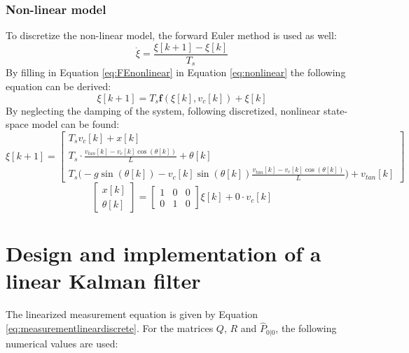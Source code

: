 \documentclass[a4paper,kul]{kulakarticle} %
\begin{document}
\subsubsection*{Non-linear model}
To discretize the non-linear model, the forward Euler method is used as well:
\begin{equation}
	\dot{\xi} = \frac{\xi[k+1]-\xi[k]}{T_s}
	\label{eq:FEnonlinear}
	\end{equation}
	By filling in Equation \ref{eq:FEnonlinear} in Equation \ref{eq:nonlinear} the following equation can be derived:
	\begin{equation}
	\xi[k+1] = T_s\mathbf{f}(\xi[k],v_c[k]) + \xi[k]
	\end{equation}
	By neglecting the damping of the system, following discretized, nonlinear state-space model can be found:
	\begin{equation}
	\xi[k+1] = \begin{bmatrix}
	T_sv_c[k] + x[k]\\T_s\cdot\frac{v_{tan}[k] - v_c[k]\cos(\theta[k])}{L} + \theta[k]\\
	T_s\bigg(-g\sin(\theta[k]) - v_c[k]\sin(\theta[k])\frac{v_{tan}[k]-v_c[k]\cos(\theta[k])}{L}\bigg) + v_{tan}[k]
	\end{bmatrix}
	\label{eq:ssnonlineardiscrete}
	\end{equation}
	\begin{equation}
	\begin{bmatrix}
	x[k]\\\theta[k]
	\end{bmatrix} = \begin{bmatrix}
	1&0&0\\0&1&0
	\end{bmatrix}\xi[k] + 0 \cdot v_c[k]
	\label{eq:measurementlineardiscrete}
\end{equation}
	
\section{Design and implementation of a linear Kalman filter}
The linearized measurement equation is given by Equation \ref{eq:measurementlineardiscrete}. For the matrices $Q$, $R$ and $\hat{P}_{0|0}$, the following numerical values are used:
\end{document}
